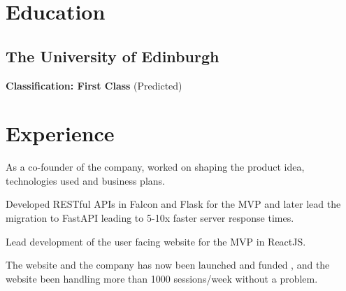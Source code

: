 \documentclass[]{deedy-resume-openfont}
\begin{document}
%
%
\lastupdated

%
%

%
%
\begin{minipage}[t]{0.66\textwidth} 



\section{Education} 
\subsection{The University of Edinburgh}
\textbf{Classification: First Class} (Predicted)
\sectionsep


\section{Experience}
\vspace{\topsep} %
\begin{tightemize}
\item As a co-founder of the company, worked on shaping the product idea, technologies used and business plans.
\item Developed RESTful APIs in Falcon and Flask for the MVP and later lead the migration to FastAPI leading to 5-10x faster server response times.
\item Lead development of the user facing website for the MVP in ReactJS.
\item The website and the company has now been launched and funded , and the website been handling more than 1000 sessions/week without a problem.
\end{tightemize}
\sectionsep


\end{minipage}
\end{document}
